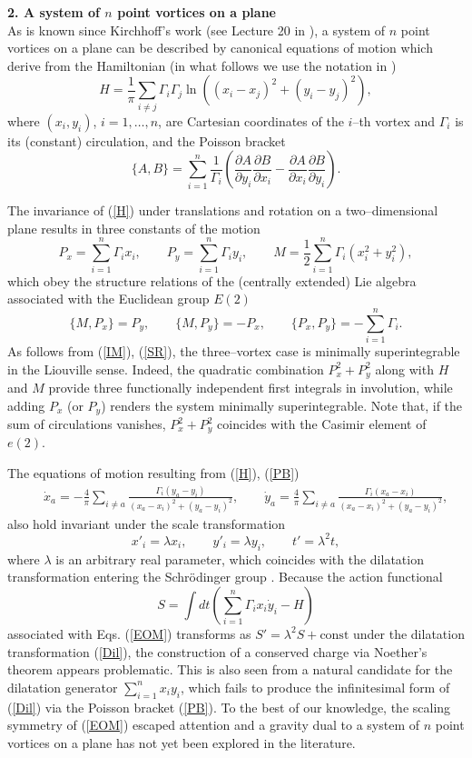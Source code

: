 \documentclass[12pt]{article}
\def\be{\begin{equation}}
\def\ee{\end{equation}}
\def\bea{\begin{eqnarray}}
\def\eea{\end{eqnarray}}
\begin{document}
\vspace{0.5cm}

\noindent
{\bf 2. A system of $n$ point vortices on a plane }\\

\noindent
As is known since Kirchhoff's work (see Lecture 20 in \cite{GK}), a system of $n$ point vortices on a plane can be described by canonical equations of motion which derive from the Hamiltonian (in what follows we use the notation in \cite{K})
\be\label{H}
H=\frac{1}{\pi} \sum_{i\ne j} \Gamma_i \Gamma_j \ln{\left({\left(x_i-x_j\right)}^2+{\left(y_i-y_j \right)}^2 \right)},
\ee
where $(x_i,y_i)$, $i=1,\dots,n$, are Cartesian coordinates of the $i$--th vortex and $\Gamma_i$ is its (constant) circulation,
and the Poisson bracket
\be\label{PB}
\{A,B\}=\sum_{i=1}^n \frac{1}{\Gamma_i} \left(\frac{\partial A}{\partial y_i} \frac{\partial B}{\partial x_i} -\frac{\partial A}{\partial x_i} \frac{\partial B}{\partial y_i} \right).
\ee

The invariance of (\ref{H}) under translations and rotation on a two--dimensional plane results in three constants of the motion
\be\label{IM}
P_x=\sum_{i=1}^n \Gamma_i x_i, \qquad P_y=\sum_{i=1}^n \Gamma_i y_i, \qquad M=\frac 12 \sum_{i=1}^n \Gamma_i \left(x_i^2+y_i^2 \right),
\ee
which obey the structure relations of the (centrally extended) Lie algebra associated with the Euclidean group $E(2)$
\be\label{SR}
\{M,P_x \}=P_y, \qquad \{M,P_y \}=-P_x, \qquad \{P_x,P_y \}=-\sum_{i=1}^n \Gamma_i.
\ee
As follows from (\ref{IM}), (\ref{SR}), the three--vortex case is minimally superintegrable in the Liouville sense. Indeed,
the quadratic combination $P_x^2+P_y^2$ along with $H$ and $M$ provide three functionally independent first integrals in involution, while adding $P_x$ (or $P_y$) renders the system minimally superintegrable.
Note that, if the sum of circulations vanishes, $P_x^2+P_y^2$ coincides with the Casimir element of $e(2)$.

The equations of motion resulting from (\ref{H}), (\ref{PB})
\bea\label{EOM}
&&
{\dot x}_a=-\frac{4}{\pi} \sum_{i \ne a} \frac{\Gamma_i (y_a-y_i)}{{\left(x_a-x_i\right)}^2+{\left(y_a-y_i \right)}^2}, \qquad {\dot y}_a=\frac{4}{\pi} \sum_{i \ne a} \frac{\Gamma_i (x_a-x_i)}{{\left(x_a-x_i\right)}^2+{\left(y_a-y_i \right)}^2},
\eea
also hold invariant under the scale transformation
\be\label{Dil}
x'_i=\lambda x_i, \qquad  y'_i=\lambda y_i, \qquad t'=\lambda^2 t,
\ee
where $\lambda$ is an arbitrary real parameter, which coincides with the dilatation transformation entering the Schr\"odinger group \cite{N}. Because the action functional
\be
S=\int dt \left(\sum_{i=1}^n \Gamma_i x_i {\dot y}_i-H \right)
\ee
associated with Eqs. (\ref{EOM}) transforms as $S'=\lambda^2 S+\mbox{const}$ under the dilatation transformation (\ref{Dil}), the construction of a conserved charge via Noether's theorem appears problematic.
This is also seen from a natural candidate for the dilatation generator $\sum_{i=1}^n x_i y_i$, which fails to produce the infinitesimal form of (\ref{Dil}) via the Poisson bracket (\ref{PB}). To the best of our knowledge, the scaling symmetry of (\ref{EOM}) escaped attention and a gravity dual to a system of $n$ point vortices on a plane has not yet been explored in the literature.
\end{document}
